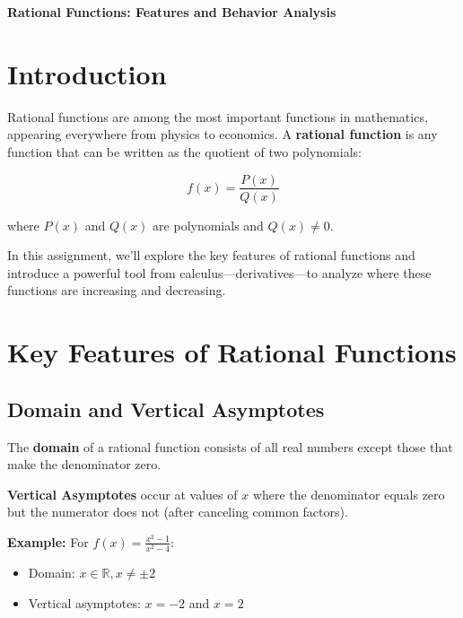 \documentclass[12pt]{article}
\begin{document}
\begin{center}
\textbf{\Large Rational Functions: Features and Behavior Analysis} \\
\vspace{0.5cm}
\hspace{0.1\textwidth}
\end{center}

\vspace{0.5cm}

\section{Introduction}

Rational functions are among the most important functions in mathematics, appearing everywhere from physics to economics. A \textbf{rational function} is any function that can be written as the quotient of two polynomials:

$$f(x) = \frac{P(x)}{Q(x)}$$

where $P(x)$ and $Q(x)$ are polynomials and $Q(x) \neq 0$.

In this assignment, we'll explore the key features of rational functions and introduce a powerful tool from calculus—derivatives—to analyze where these functions are increasing and decreasing.

\section{Key Features of Rational Functions}

\subsection{Domain and Vertical Asymptotes}

The \textbf{domain} of a rational function consists of all real numbers except those that make the denominator zero.

\textbf{Vertical Asymptotes} occur at values of $x$ where the denominator equals zero but the numerator does not (after canceling common factors).

\textbf{Example:} For $f(x) = \frac{x^2 - 1}{x^2 - 4}$:
\begin{itemize}
\item Domain: $x \in \mathbb{R}, x \neq \pm 2$
\item Vertical asymptotes: $x = -2$ and $x = 2$
\end{itemize}
\end{document}
